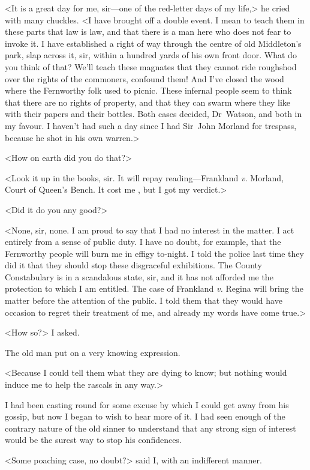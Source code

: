 <It is a great day for me, sir—one of the red-letter days of my life,> he cried with many chuckles. <I have brought off a double event. I mean to teach them in these parts that law is law, and that there is a man here who does not fear to invoke it. I have established a right of way through the centre of old Middleton's park, slap across it, sir, within a hundred yards of his own front door. What do you think of that? We'll teach these magnates that they cannot ride roughshod over the rights of the commoners, confound them! And I've closed the wood where the Fernworthy folk used to picnic. These infernal people seem to think that there are no rights of property, and that they can swarm where they like with their papers and their bottles. Both cases decided, Dr~Watson, and both in my favour. I haven't had such a day since I had Sir~John Morland for trespass, because he shot in his own warren.>

<How on earth did you do that?>

<Look it up in the books, sir. It will repay reading—Frankland \textit{v.} Morland, Court of Queen's Bench. It cost me , but I got my verdict.>

<Did it do you any good?>

<None, sir, none. I am proud to say that I had no interest in the matter. I act entirely from a sense of public duty. I have no doubt, for example, that the Fernworthy people will burn me in effigy to-night. I told the police last time they did it that they should stop these disgraceful exhibitions. The County Constabulary is in a scandalous state, sir, and it has not afforded me the protection to which I am entitled. The case of Frankland \textit{v.} Regina will bring the matter before the attention of the public. I told them that they would have occasion to regret their treatment of me, and already my words have come true.>

<How so?> I asked.

The old man put on a very knowing expression.

<Because I could tell them what they are dying to know; but nothing would induce me to help the rascals in any way.>

I had been casting round for some excuse by which I could get away from his gossip, but now I began to wish to hear more of it. I had seen enough of the contrary nature of the old sinner to understand that any strong sign of interest would be the surest way to stop his confidences.

<Some poaching case, no doubt?> said I, with an indifferent manner.

